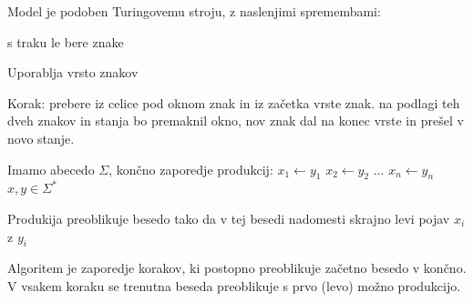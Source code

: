 \documentclass[10pt,a4paper,oneside]{book}
\begin{document}



Model je podoben Turingovemu stroju, z naslenjimi spremembami:
\begin{items}
\item s traku le bere znake
\item Uporablja vrsto znakov
\end{items}

Korak: prebere iz celice pod oknom znak in iz začetka vrste znak. na podlagi teh dveh znakov in stanja bo premaknil okno, nov znak dal na konec vrste in prešel v novo stanje.



Imamo abecedo $\Sigma$, končno zaporedje produkcij:
$x_1 \leftarrow y_1$
$x_2 \leftarrow y_2$
...
$x_n \leftarrow y_n$
$x,y \in \Sigma^*$%

Produkija preoblikuje besedo tako da v tej besedi nadomesti skrajno levi pojav $x_i$ z $y_i$ %

Algoritem je zaporedje korakov, ki postopno preoblikuje začetno besedo v končno. V vsakem koraku se trenutna beseda preoblikuje s prvo (levo) možno produkcijo.

\end{document}
